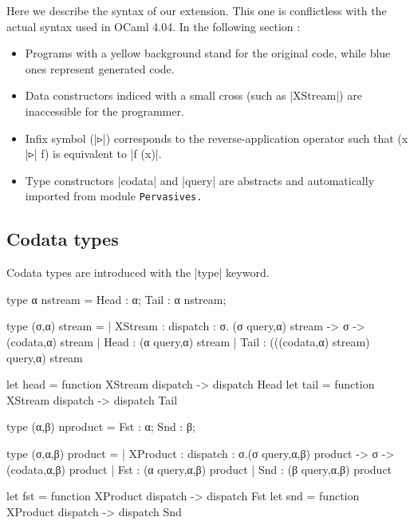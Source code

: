 Here we describe the syntax of our extension.
This one is conflictless with the actual syntax used in OCaml 4.04. In the
following section :

\begin{itemize}
\item Programs with a yellow background stand for the original code, while
  blue ones represent generated code.
\item Data constructors indiced with a small cross (such as |XStream|) are
  inaccessible for the programmer.
\item Infix symbol (|▹|) corresponds to the reverse-application operator such that
  (x |▹| f) is equivalent to |f (x)|.
\item Type constructors |codata| and |query| are abstracts and automatically
  imported from module \tt{Pervasives}.
\end{itemize}

\subsection{Codata types}

Codata types are introduced with the |type| keyword.

\sourcecode
\begin{code}
  type α nstream = {
    Head  :  α;
    Tail  :  α nstream;
  }
\end{code}

\gencode
\begin{code}
type (σ,α) stream =
  | XStream  : { dispatch : σ. (σ query,α) stream -> σ } -> (codata,α) stream
  | Head     : (α query,α) stream
  | Tail     : (((codata,α) stream) query,α) stream

let head  = function XStream {dispatch} -> dispatch Head
let tail  = function XStream {dispatch} -> dispatch Tail
\end{code}

\sourcecode
\begin{code}
  type (α,β) nproduct = {
    Fst  :  α;
    Snd  :  β;
  }
\end{code}

\gencode
\begin{code}
type (σ,α,β) product =
  | XProduct  : {dispatch : σ.(σ query,α,β) product -> σ} -> (codata,α,β) product
  | Fst       : (α query,α,β) product
  | Snd       : (β query,α,β) product

let fst  = function XProduct {dispatch} -> dispatch Fst
let snd  = function XProduct {dispatch} -> dispatch Snd
\end{code}


